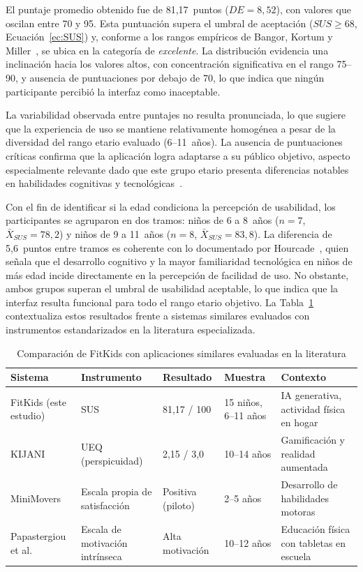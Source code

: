 				El puntaje promedio obtenido fue de 81,17~puntos ($DE = 8{,}52$), con valores que oscilan entre 70 y 95. Esta puntuación supera el umbral de aceptación ($SUS \geq 68$, Ecuación~\eqref{ec:SUS}) y, conforme a los rangos empíricos de Bangor, Kortum y Miller~\cite{Bangor2008}, se ubica en la categoría de \textit{excelente}. La distribución evidencia una inclinación hacia los valores altos, con concentración significativa en el rango 75--90, y ausencia de puntuaciones por debajo de 70, lo que indica que ningún participante percibió la interfaz como inaceptable.
				
				La variabilidad observada entre puntajes no resulta pronunciada, lo que sugiere que la experiencia de uso se mantiene relativamente homogénea a pesar de la diversidad del rango etario evaluado (6--11~años). La ausencia de puntuaciones críticas confirma que la aplicación logra adaptarse a su público objetivo, aspecto especialmente relevante dado que este grupo etario presenta diferencias notables en habilidades cognitivas y tecnológicas~\cite{Hourcade2015}.
				
				Con el fin de identificar si la edad condiciona la percepción de usabilidad, los participantes se agruparon en dos tramos: niños de 6 a 8~años ($n = 7$, $\bar{X}_{SUS} = 78{,}2$) y niños de 9 a 11~años ($n = 8$, $\bar{X}_{SUS} = 83{,}8$). La diferencia de 5,6~puntos entre tramos es coherente con lo documentado por Hourcade~\cite{Hourcade2015}, quien señala que el desarrollo cognitivo y la mayor familiaridad tecnológica en niños de más edad incide directamente en la percepción de facilidad de uso. No obstante, ambos grupos superan el umbral de usabilidad aceptable, lo que indica que la interfaz resulta funcional para todo el rango etario objetivo. La Tabla~\ref{tab:sus_comparacion} contextualiza estos resultados frente a sistemas similares evaluados con instrumentos estandarizados en la literatura especializada.
				
				\begin{table}[H]
					\centering\small
					\caption{Comparación de FitKids con aplicaciones similares evaluadas en la literatura}
					\label{tab:sus_comparacion}
					\begin{tabular}{p{2.5cm}p{2.5cm}p{2.5cm}p{2.5cm}p{3.5cm}}
						\hline
						\textbf{Sistema} & \textbf{Instrumento} & \textbf{Resultado} & \textbf{Muestra} & \textbf{Contexto}\\
						\hline
						FitKids (este estudio) & SUS & 81,17 / 100 & 15 niños, 6--11 años & IA generativa, actividad física en hogar\\
						KIJANI~\cite{Willinger2024} & UEQ (perspicuidad) & 2,15 / 3,0 & 10--14 años & Gamificación y realidad aumentada\\
						MiniMovers~\cite{Zhang2024} & Escala propia de satisfacción & Positiva (piloto) & 2--5 años & Desarrollo de habilidades motoras\\
						Papastergiou et al.~\cite{Papastergiou2021} & Escala de motivación intrínseca & Alta motivación & 10--12 años & Educación física con tabletas en escuela\\
						\hline
					\end{tabular}
				\end{table}
				\tblnote
				
